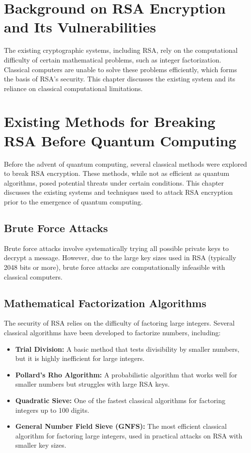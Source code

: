 \documentclass[12pt,a4paper]{report}
\begin{document}
\chapter{Background on RSA Encryption and Its Vulnerabilities}
The existing cryptographic systems, including RSA, rely on the computational difficulty of certain mathematical problems, such as integer factorization. Classical computers are unable to solve these problems efficiently, which forms the basis of RSA's security. This chapter discusses the existing system and its reliance on classical computational limitations.

\chapter{Existing Methods for Breaking RSA Before Quantum Computing}
Before the advent of quantum computing, several classical methods were explored to break RSA encryption. These methods, while not as efficient as quantum algorithms, posed potential threats under certain conditions. This chapter discusses the existing systems and techniques used to attack RSA encryption prior to the emergence of quantum computing.

\section{Brute Force Attacks}
Brute force attacks involve systematically trying all possible private keys to decrypt a message. However, due to the large key sizes used in RSA (typically 2048 bits or more), brute force attacks are computationally infeasible with classical computers.

\section{Mathematical Factorization Algorithms}
The security of RSA relies on the difficulty of factoring large integers. Several classical algorithms have been developed to factorize numbers, including:
\begin{itemize}
    \item \textbf{Trial Division:} A basic method that tests divisibility by smaller numbers, but it is highly inefficient for large integers.
    \item \textbf{Pollard's Rho Algorithm:} A probabilistic algorithm that works well for smaller numbers but struggles with large RSA keys.
    \item \textbf{Quadratic Sieve:} One of the fastest classical algorithms for factoring integers up to 100 digits.
    \item \textbf{General Number Field Sieve (GNFS):} The most efficient classical algorithm for factoring large integers, used in practical attacks on RSA with smaller key sizes.
\end{itemize}
\end{document}
